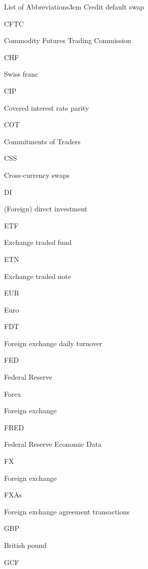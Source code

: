 \documentclass[a4paper, twoside]{templates/ociamthesis}
\begin{document}
\begin{romanpages}
\begin{mclistof}{List of Abbreviations}{3cm}
Credit default swap

\item[CFTC]

Commodity Futures Trading Commission

\item[CHF]

Swiss franc

\item[CIP]

Covered interest rate parity

\item[COT]

Commitments of Traders

\item[CSS]

Cross-currency swaps

\item[DI]

(Foreign) direct investment

\item[ETF]

Exchange traded fund

\item[ETN]

Exchange traded note

\item[EUR]

Euro

\item[FDT]

Foreign exchange daily turnover

\item[FED]

Federal Reserve

\item[Forex]

Foreign exchange

\item[FRED]

Federal Reserve Economic Data

\item[FX]

Foreign exchange

\item[FXAs]

Foreign exchange agreement transactions

\item[GBP]

British pound

\item[GCF]


\end{mclistof}
\end{romanpages}
\end{document}
